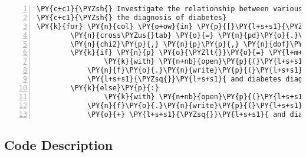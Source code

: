 \documentclass[12pt]{article}
\begin{document}
\begin{Verbatim}[commandchars=\\\{\},numbers=left,firstnumber=1,stepnumber=1,formatcom=\footnotesize]
\PY{c+c1}{\PYZsh{} Investigate the relationship between various health indicators and}
\PY{c+c1}{\PYZsh{} the diagnosis of diabetes}
\PY{k}{for} \PY{n}{col} \PY{o+ow}{in} \PY{p}{[}\PY{l+s+s1}{\PYZsq{}}\PY{l+s+s1}{BMI}\PY{l+s+s1}{\PYZsq{}}\PY{p}{,} \PY{l+s+s1}{\PYZsq{}}\PY{l+s+s1}{PhysActivity}\PY{l+s+s1}{\PYZsq{}}\PY{p}{,} \PY{l+s+s1}{\PYZsq{}}\PY{l+s+s1}{Fruits}\PY{l+s+s1}{\PYZsq{}}\PY{p}{,} \PY{l+s+s1}{\PYZsq{}}\PY{l+s+s1}{Veggies}\PY{l+s+s1}{\PYZsq{}}\PY{p}{]}\PY{p}{:}
        \PY{n}{cross\PYZus{}tab} \PY{o}{=} \PY{n}{pd}\PY{o}{.}\PY{n}{crosstab}\PY{p}{(}\PY{n}{df}\PY{p}{[}\PY{l+s+s1}{\PYZsq{}}\PY{l+s+s1}{Diabetes\PYZus{}binary}\PY{l+s+s1}{\PYZsq{}}\PY{p}{]}\PY{p}{,} \PY{n}{df}\PY{p}{[}\PY{n}{col}\PY{p}{]}\PY{p}{)}
        \PY{n}{chi2}\PY{p}{,} \PY{n}{p}\PY{p}{,} \PY{n}{dof}\PY{p}{,} \PY{n}{expected} \PY{o}{=} \PY{n}{chi2\PYZus{}contingency}\PY{p}{(}\PY{n}{cross\PYZus{}tab}\PY{p}{)}
        \PY{k}{if} \PY{n}{p} \PY{o}{\PYZlt{}}\PY{o}{=} \PY{l+m+mf}{0.05}\PY{p}{:}
                \PY{k}{with} \PY{n+nb}{open}\PY{p}{(}\PY{l+s+s1}{\PYZsq{}}\PY{l+s+s1}{results.txt}\PY{l+s+s1}{\PYZsq{}}\PY{p}{,} \PY{l+s+s1}{\PYZsq{}}\PY{l+s+s1}{a}\PY{l+s+s1}{\PYZsq{}}\PY{p}{)} \PY{k}{as} \PY{n}{f}\PY{p}{:}
            \PY{n}{f}\PY{o}{.}\PY{n}{write}\PY{p}{(}\PY{l+s+s1}{\PYZsq{}}\PY{l+s+s1}{Significant relationship found between }\PY{l+s+s1}{\PYZsq{}} \PY{o}{+} \PY{n}{col} \PY{o}{+} \PYZbs{}
            \PY{l+s+s1}{\PYZsq{}}\PY{l+s+s1}{ and diabetes diagnosis.}\PY{l+s+se}{\PYZbs{}n}\PY{l+s+se}{\PYZbs{}n}\PY{l+s+s1}{\PYZsq{}}\PY{p}{)}
        \PY{k}{else}\PY{p}{:}
                \PY{k}{with} \PY{n+nb}{open}\PY{p}{(}\PY{l+s+s1}{\PYZsq{}}\PY{l+s+s1}{results.txt}\PY{l+s+s1}{\PYZsq{}}\PY{p}{,} \PY{l+s+s1}{\PYZsq{}}\PY{l+s+s1}{a}\PY{l+s+s1}{\PYZsq{}}\PY{p}{)} \PY{k}{as} \PY{n}{f}\PY{p}{:}
            \PY{n}{f}\PY{o}{.}\PY{n}{write}\PY{p}{(}\PY{l+s+s1}{\PYZsq{}}\PY{l+s+s1}{No significant relationship found between }\PY{l+s+s1}{\PYZsq{}} \PY{o}{+} \PY{n}{col} \PYZbs{}
            \PY{o}{+} \PY{l+s+s1}{\PYZsq{}}\PY{l+s+s1}{ and diabetes diagnosis.}\PY{l+s+se}{\PYZbs{}n}\PY{l+s+se}{\PYZbs{}n}\PY{l+s+s1}{\PYZsq{}}\PY{p}{)}
\end{Verbatim}
\subsection{Code Description}
\end{document}
